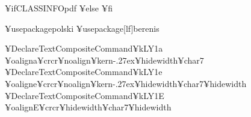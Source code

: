%
¥ifCLASSINFOpdf
¥else
¥fi
%
%


¥usepackage{polski}
¥usepackage[lf]{berenis}

¥DeclareTextCompositeCommand{¥k}{LY1}{a}
  {¥oalign{a¥crcr¥noalign{¥kern-.27ex}¥hidewidth¥char7}}
¥DeclareTextCompositeCommand{¥k}{LY1}{e}
  {¥oalign{e¥crcr¥noalign{¥kern-.27ex}¥hidewidth¥char7¥hidewidth}}
¥DeclareTextCompositeCommand{¥k}{LY1}{E}
  {¥oalign{E¥crcr¥hidewidth¥char7¥hidewidth}}


%
%





